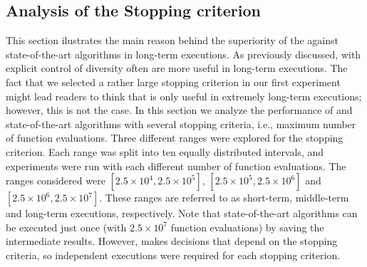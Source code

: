 
\subsection{Analysis of the Stopping criterion}

This section ilustrates the main reason behind the superiority of the \VSDMOEA{} against state-of-the-art algorithms in long-term executions.
%
As previously discussed, \EAS{} with explicit control of diversity often are more useful in long-term executions.
%
The fact that we selected a rather large stopping criterion in our first experiment might lead readers to think that \VSDMOEA{} is only
useful in extremely long-term executions;
%
however, this is not the case.
%
In this section we analyze the performance of \VSDMOEA{} and state-of-the-art algorithms with several stopping criteria, 
i.e., maximum number of function evaluations.
%
Three different ranges were explored for the stopping criterion.
%
Each range was split into ten equally distributed intervals, and experiments were run with each different number of function evaluations.
%
The ranges considered were $[2.5 \times 10^4, 2.5 \times 10^5]$, $[2.5 \times 10^5, 2.5 \times 10^6]$ and $[2.5 \times 10^6, 2.5 \times 10^7]$.
%
These ranges are referred to as short-term, middle-term and long-term executions, respectively.
%
Note that state-of-the-art algorithms can be executed just once (with $2.5 \times 10^7$ function evaluations) by saving the intermediate results.
%
However, \VSDMOEA{} makes decisions that depend on the stopping criteria, so independent executions were required for each stopping criterion.

